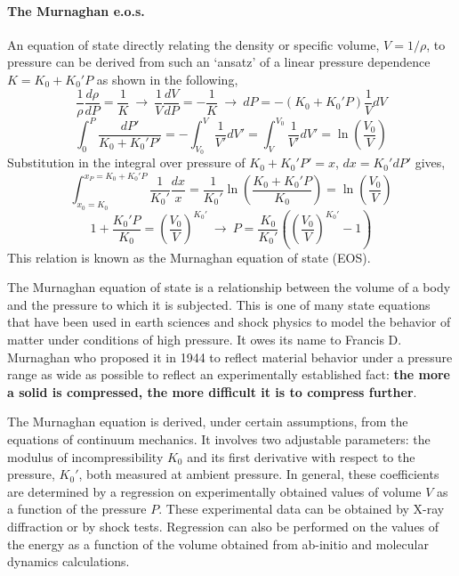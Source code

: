 \paragraph{The Murnaghan e.o.s.} 
An equation of state directly relating the density or specific volume,
$V = 1/\rho$,
to pressure can be derived from such an 
`ansatz' of a linear pressure dependence $K = K_0 + K_0' P$
as shown in the following,
\begin{equation}
 \frac{1}{\rho} \frac{d\rho}{dP} =\frac{1}{K}
 ~\rightarrow~
 \frac{1}{V} \frac{dV}{dP} =-\frac{1}{K}
 ~\rightarrow~
  dP = -(K_0+K_0'P)\frac{1}{V} dV
\end{equation}
\begin{equation}
  \int_0^P \frac{dP'}{K_0+K_0'P'}
   =
 -\int_{V_0}^V \frac{1}{V'}dV'
   =
  \int_V^{V_0} \frac{1}{V'}dV'
   =
  \ln \left ( \frac{V_0}{V} \right )
\end{equation}
Substitution in the integral over pressure of 
$K_0+K_0'P'=x$, $dx=K_0'dP'$ gives,
\begin{equation}
 \int_{x_0=K_0}^{x_P=K_0+K_0'P}
  \frac{1}{K_0'} \frac{dx}{x}
  =
  \frac{1}{K_0'} \ln \left ( \frac{K_0+K_0'P}{K_0} \right )
  =
  \ln \left ( \frac{V_0}{V} \right )
\end{equation}
\begin{equation}
  1 + \frac{K_0'P}{K_0}
  =
  \left ( \frac{V_0}{V} \right )^{K_0'}
  ~\rightarrow~
  P = \frac{K_0}{K_0'} 
      \left (
        \left (
            \frac{V_0}{V}
       \right )^{K_0'}  -1
     \right )
\label{eqn_murnaghan_eos}
\end{equation}
This relation is known as the Murnaghan equation of state (EOS).

The Murnaghan equation of state is a relationship between the volume of a body and the pressure to which it is subjected. 
This is one of many state equations that have been used in earth sciences and shock physics to model the behavior 
of matter under conditions of high pressure. It owes its name to Francis D. Murnaghan 
who proposed it in 1944 to reflect material behavior under a pressure range as wide as possible 
to reflect an experimentally established fact: {\bf the more a solid is compressed, the more difficult it is to compress further}.

The Murnaghan equation is derived, under certain assumptions, from the equations of continuum mechanics. 
It involves two adjustable parameters: the modulus of incompressibility $K_0$ and its first derivative 
with respect to the pressure, $K_0'$, both measured at ambient pressure. 
In general, these coefficients are determined by a regression on experimentally obtained values 
of volume $V$ as a function of the pressure $P$. 
These experimental data can be obtained by X-ray diffraction or by shock tests. 
Regression can also be performed on the values of the energy as a function of the volume obtained from ab-initio and molecular dynamics calculations.


